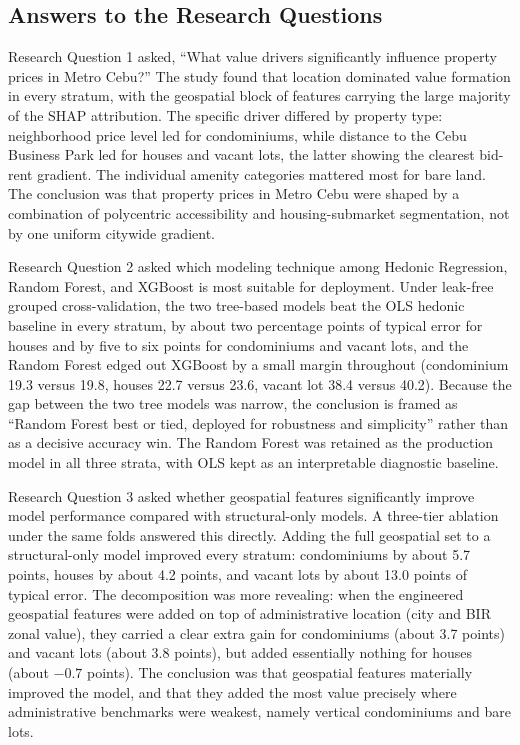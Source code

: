 \subsection{Answers to the Research Questions}\label{answers-to-the-research-questions}

Research Question 1 asked, ``What value drivers significantly influence property prices in Metro Cebu?'' The study found that location dominated value formation in every stratum, with the geospatial block of features carrying the large majority of the SHAP attribution. The specific driver differed by property type: neighborhood price level led for condominiums, while distance to the Cebu Business Park led for houses and vacant lots, the latter showing the clearest bid-rent gradient. The individual amenity categories mattered most for bare land. The conclusion was that property prices in Metro Cebu were shaped by a combination of polycentric accessibility and housing-submarket segmentation, not by one uniform citywide gradient.

Research Question 2 asked which modeling technique among Hedonic Regression, Random Forest, and XGBoost is most suitable for deployment. Under leak-free grouped cross-validation, the two tree-based models beat the OLS hedonic baseline in every stratum, by about two percentage points of typical error for houses and by five to six points for condominiums and vacant lots, and the Random Forest edged out XGBoost by a small margin throughout (condominium 19.3 versus 19.8, houses 22.7 versus 23.6, vacant lot 38.4 versus 40.2). Because the gap between the two tree models was narrow, the conclusion is framed as ``Random Forest best or tied, deployed for robustness and simplicity'' rather than as a decisive accuracy win. The Random Forest was retained as the production model in all three strata, with OLS kept as an interpretable diagnostic baseline.

Research Question 3 asked whether geospatial features significantly improve model performance compared with structural-only models. A three-tier ablation under the same folds answered this directly. Adding the full geospatial set to a structural-only model improved every stratum: condominiums by about 5.7 points, houses by about 4.2 points, and vacant lots by about 13.0 points of typical error. The decomposition was more revealing: when the engineered geospatial features were added on top of administrative location (city and BIR zonal value), they carried a clear extra gain for condominiums (about 3.7 points) and vacant lots (about 3.8 points), but added essentially nothing for houses (about $-0.7$ points). The conclusion was that geospatial features materially improved the model, and that they added the most value precisely where administrative benchmarks were weakest, namely vertical condominiums and bare lots.

